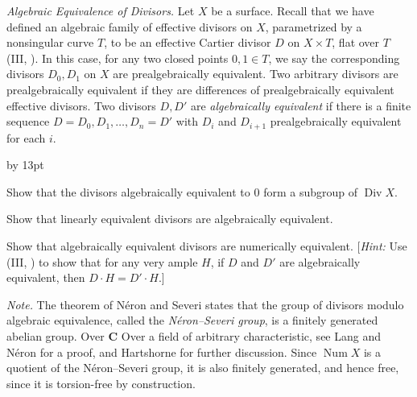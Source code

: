 {{\vspace{2pt}
\noindent\hypertarget{ex-V-1.7}{}\emph{Algebraic Equivalence of Divisors.} Let $X$ be a surface. Recall that we have defined an algebraic family of effective divisors on $X$, parametrized by a nonsingular curve $T$, to be an effective Cartier divisor $D$ on $X\times T$, flat over $T$ (III, ). In this case, for any two closed points $0,1\in T$, we say the corresponding divisors $D_0,D_1$ on $X$ are prealgebraically equivalent. Two arbitrary divisors are prealgebraically equivalent if they are differences of prealgebraically equivalent effective divisors. Two divisors $D,D'$ are \emph{algebraically equivalent} if there is a finite sequence $D=D_0,D_1,\ldots,D_n=D'$ with $D_i$ and $D_{i+1}$ prealgebraically equivalent for each $i$.
{\advance\leftskip by 13pt\par
\noindent\hypertarget{ex-V-1.7a}{}Show that the divisors algebraically equivalent to $0$ form a subgroup of $\operatorname{Div}X$.

\noindent\hypertarget{ex-V-1.7b}{}Show that linearly equivalent divisors are algebraically equivalent.

\noindent\hypertarget{ex-V-1.7c}{}Show that algebraically equivalent divisors are numerically equivalent. [\emph{Hint:} Use (III, ) to show that for any very ample $H$, if $D$ and $D'$ are algebraically equivalent, then $D\cdot H=D'\cdot H$.]\par}

\emph{Note.} The theorem of N\'eron and Severi states that the group of divisors modulo algebraic equivalence, called the \emph{N\'eron--Severi group}, is a finitely generated abelian group. Over $\mathbf C$
Over a field of arbitrary characteristic, see Lang and N\'eron  for a proof, and Hartshorne  for further discussion. Since $\operatorname{Num}X$ is a quotient of the N\'eron--Severi group, it is also finitely generated, and hence free, since it is torsion-free by construction.

}}
